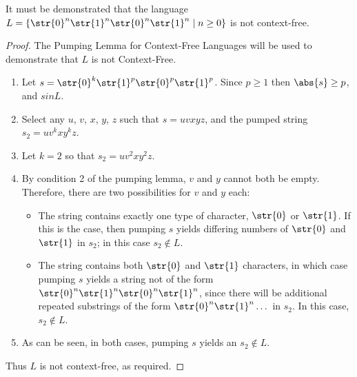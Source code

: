It must be demonstrated that the language $L = \{ \str{0}^n\str{1}^n\str{0}^n\str{1}^n \mid n \geq 0 \}$ is not context-free.
\begin{proof}
	The Pumping Lemma for Context-Free Languages will be used to demonstrate that $L$ is not Context-Free.
	\begin{enumerate}[label=\Roman*.]
		\item Let $s = \str{0}^k\str{1}^p\str{0}^p\str{1}^p$. Since $p \geq 1$ then $\abs{s} \geq p$, and $s in L$.
		\item Select any $u$, $v$, $x$, $y$, $z$ such that $s = uvxyz$, and the pumped string $s_2 = uv^kxy^kz$.
		\item Let $k=2$ so that $s_2 = uv^2xy^2z$.
		\item By condition 2 of the pumping lemma, $v$ and $y$ cannot both be empty. Therefore, there are two possibilities for $v$ and $y$ each:
		\begin{itemize}
			\item The string contains exactly one type of character, $\str{0}$ or $\str{1}$. If this is the case, then pumping $s$ yields differing numbers of $\str{0}$ and $\str{1}$ in $s_2$; in this case $s_2 \notin L$.
			\item The string contains both $\str{0}$ and $\str{1}$ characters, in which case pumping $s$ yields a string not of the form $\str{0}^n\str{1}^n\str{0}^n\str{1}^n$, since there will be additional repeated substrings of the form $\str{0}^n\str{1}^n\dots$ in $s_2$. In this case, $s_2 \notin L$.
		\end{itemize}
		\item As can be seen, in both cases, pumping $s$ yields an $s_2 \notin L$.
	\end{enumerate}
	Thus $L$ is not context-free, as required.
\end{proof}